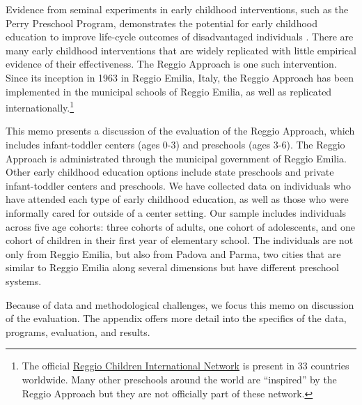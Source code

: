 Evidence from seminal experiments in early childhood interventions, such as the Perry Preschool Program, demonstrates the potential for early childhood education to improve life-cycle outcomes of disadvantaged individuals \citep{Heckman_Moon_etal_2010_QE, Elango_Hojman_etal_2016_Early-Edu}. There are many early childhood interventions that are widely replicated with little empirical evidence of their effectiveness. The Reggio Approach is one such intervention. Since its inception in 1963 in Reggio Emilia, Italy, the Reggio Approach has been implemented in the municipal schools of Reggio Emilia, as well as replicated internationally.\footnote{The official \href{http://www.reggiochildren.it/network/?lang=en}{Reggio Children International Network} is present in 33 countries worldwide. Many other preschools around the world are ``inspired'' by the Reggio Approach but they are not officially part of these network.}

This memo presents a discussion of the evaluation of the Reggio Approach, which includes infant-toddler centers (ages 0-3) and preschools (ages 3-6). The Reggio Approach is administrated through the municipal government of Reggio Emilia. Other early childhood education options include state preschools and private infant-toddler centers and preschools. We have collected data on individuals who have attended each type of early childhood education, as well as those who were informally cared for outside of a center setting. Our sample includes individuals across five age cohorts: three cohorts of adults, one cohort of adolescents, and one cohort of children in their first year of elementary school. The individuals are not only from Reggio Emilia, but also from Padova and Parma, two cities that are similar to Reggio Emilia along several dimensions but have different preschool systems. 

Because of data and methodological challenges, we focus this memo on discussion of the evaluation. The appendix offers more detail into the specifics of the data, programs, evaluation, and results.

